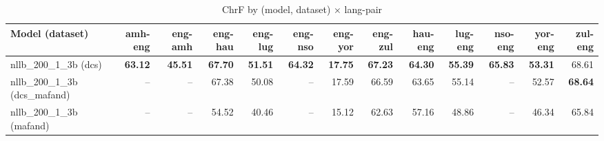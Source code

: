 \begin{table}[t]
\centering
\caption{ChrF by (model, dataset) × lang-pair}
\begin{tabular}{lrrrrrrrrrrrr}
\toprule
Model (dataset) & amh-eng & eng-amh & eng-hau & eng-lug & eng-nso & eng-yor & eng-zul & hau-eng & lug-eng & nso-eng & yor-eng & zul-eng \\
\midrule
nllb\_200\_1\_3b (dcs) & \textbf{63.12} & \textbf{45.51} & \textbf{67.70} & \textbf{51.51} & \textbf{64.32} & \textbf{17.75} & \textbf{67.23} & \textbf{64.30} & \textbf{55.39} & \textbf{65.83} & \textbf{53.31} & 68.61 \\
nllb\_200\_1\_3b (dcs\_mafand) & -- & -- & 67.38 & 50.08 & -- & 17.59 & 66.59 & 63.65 & 55.14 & -- & 52.57 & \textbf{68.64} \\
nllb\_200\_1\_3b (mafand) & -- & -- & 54.52 & 40.46 & -- & 15.12 & 62.63 & 57.16 & 48.86 & -- & 46.34 & 65.84 \\
\bottomrule
\end{tabular}
\end{table}